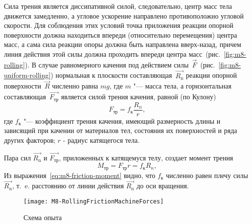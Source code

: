 \documentclass[a4paper, 12pt]{extarticle}
\begin{document}
Сила трения является диссипативной силой, следовательно, центр масс тела движется замедленно, а угловое ускорение направлено противоположно угловой скорости. Для соблюдения этих условий точка приложения реакции опорной  поверхности должна находиться впереди (относительно перемещения) центра масс, а сама сила реакции опоры должна быть направлена вверх-назад, причем линия действия этой силы должна проходить впереди центра масс~(рис.~\ref{fig:m8-rolling}). В случае равномерного качения под действием силы~$\vec{F}$~(рис.~\ref{fig:m8-uniform-rolling}) нормальная к плоскости составляющая~$\vec{R_\text{n}}$ реакции опорной поверхности~$\vec{R}$ численно равна $mg$, где $m$ "--- масса тела, а горизонтальная составляющая~$\vec{F_\text{тр}}$ является силой трения качения, равной (по Кулону) %
\begin{equation}
\label{eq:m8-rolling-resistance}
F_\text{тр} = f_\text{к} \frac{R_n}{r}, %
\end{equation}
где $f_\text{к}$ "--- коэффициент трения качения, имеющий размерность длины и зависящий при качении от материалов тел, состояния их поверхностей и ряда других факторов;
$r$ - радиус катящегося тела.

Пара сил $\vec{R_\text{n}}$ и $\vec{F_\text{тр}}$, приложенных к катящемуся телу, создает момент трения %
\begin{equation}
\label{eq:m8-friction-moment}
M_\text{тр} = F_\text{тр}r = f_\text{к} R_n,
\end{equation}
Из выражения~\eqref{eq:m8-friction-moment} видно, что $f_\text{к}$ численно равен плечу силы $\vec{R_\text{n}}$, т.~e. расстоянию от линии действия $\vec{R_\text{n}}$ до оси вращения. %

\begin{figure}[h]
\begin{center}
\texttt{[image: M8-RollingFrictionMachineForces]}
\end{center}
\caption{Схема опыта \label{fig:m8-scheme}}
\end{figure}
\end{document}
